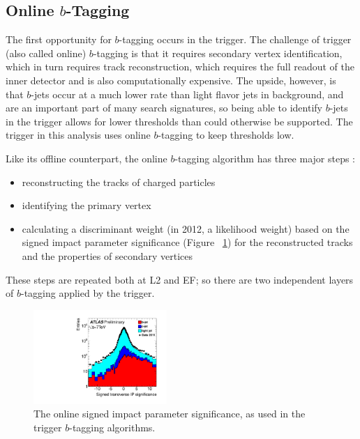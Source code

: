 \subsection{Online $b$-Tagging}
The first opportunity for $b$-tagging occurs in the trigger.  The challenge of trigger (also called online)
$b$-tagging is that it requires secondary vertex identification, which in turn requires track reconstruction,
which requires the full readout of the inner detector and is also computationally expensive.  The upside,
however, is that $b$-jets occur at a much lower rate than light flavor jets in background, and are an important
part of many search signatures, so being able to identify $b$-jets in the trigger allows for lower
thresholds than could otherwise be supported.  The trigger in this analysis uses online $b$-tagging to keep
thresholds low. 

Like its offline counterpart, the online $b$-tagging algorithm has three major steps \cite{online_btag_2}:
\begin{itemize}
    \item reconstructing the tracks of charged particles
    \item identifying the primary vertex
    \item calculating a discriminant weight (in 2012, a likelihood weight) based on the signed impact parameter significance 
    (Figure ~\ref{fig:ip_sig}) for the reconstructed tracks and the properties of secondary vertices
\end{itemize}

These steps are repeated both at L2 and EF; so there are two independent layers of $b$-tagging applied by the
trigger.

\begin{figure}
   \includegraphics[width=0.45\textwidth]{ReconstructionPerformance/online_btag_IP.pdf}
   \caption{The online signed impact parameter significance, as used in the trigger $b$-tagging algorithms. \label{fig:ip_sig} }
\end{figure}


